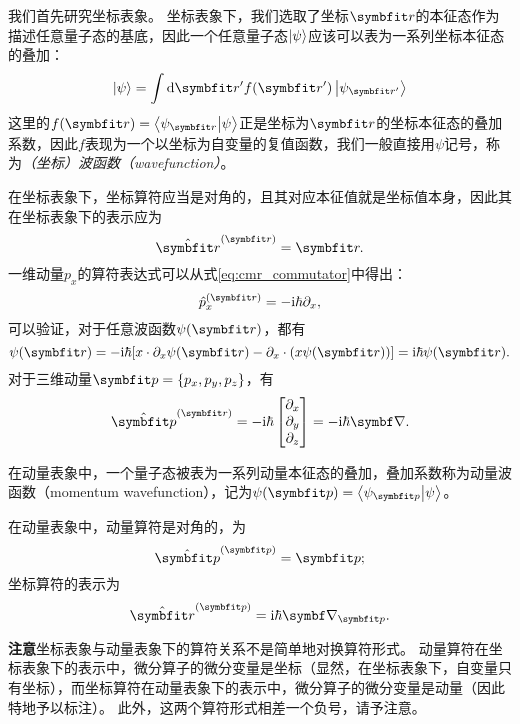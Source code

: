 我们首先研究坐标表象。
坐标表象下，我们选取了坐标$\rr$的本征态作为描述任意量子态的基底，因此一个任意量子态$\ket{\psi}$应该可以表为一系列坐标本征态的叠加：
\begin{equation}
    \ket{\psi} = \int \dd\rr' f(\rr') \ket{\psi_{\rr'}}
\end{equation}
这里的$f(\rr)=\braket{\psi_{\rr}}{\psi}$正是坐标为$\rr$的坐标本征态的叠加系数，因此$f$表现为一个以坐标为自变量的复值函数，我们一般直接用$\psi$记号，称为\emph{（坐标）波函数（wavefunction）}。

\begin{tcolorbox}
在坐标表象下，坐标算符应当是对角的，且其对应本征值就是坐标值本身，因此其在坐标表象下的表示应为
\begin{equation}
    \hat{\rr}^{(\rr)} = \rr.
\end{equation}
一维动量$p_x$的算符表达式可以从式\eqref{eq:cmr_commutator}中得出：
\begin{equation}
    \hat{p}_x^{(\rr)} = -\ii\hbar\pd_x,
\end{equation}
可以验证，对于任意波函数$\psi(\rr)$，都有
\begin{equation}
    [x,\hat{p}_x] \psi(\rr) = -\ii\hbar [x\cdot\pd_x\psi(\rr) - \pd_x\cdot (x\psi(\rr))] = \ii\hbar \psi(\rr).
\end{equation}
对于三维动量$\pp=\{p_x,p_y,p_z\}$，有
\begin{equation}
    \hat{\pp}^{(\rr)} = -\ii\hbar
    \begin{bmatrix}
        \pd_x \\ \pd_y \\ \pd_z
    \end{bmatrix}
    = -\ii\hbar\del.
\end{equation}
\end{tcolorbox}

在动量表象中，一个量子态被表为一系列动量本征态的叠加，叠加系数称为动量波函数（momentum wavefunction），记为$\psi(\pp)=\braket{\psi_{\pp}}{\psi}$。
\begin{tcolorbox}
    在动量表象中，动量算符是对角的，为
    \begin{equation}
        \hat{\pp}^{(\pp)} = \pp;
    \end{equation}
    坐标算符的表示为
    \begin{equation}
        \hat{\rr}^{(\pp)} = \ii\hbar\del_{\pp}.
    \end{equation}

    \textbf{注意}\quad 坐标表象与动量表象下的算符关系不是简单地对换算符形式。
    动量算符在坐标表象下的表示中，微分算子的微分变量是坐标（显然，在坐标表象下，自变量只有坐标），而坐标算符在动量表象下的表示中，微分算子的微分变量是动量（因此特地予以标注）。
    此外，这两个算符形式相差一个负号，请予注意。
\end{tcolorbox}


